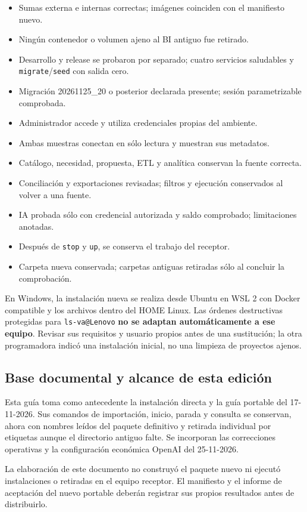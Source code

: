 \documentclass[
  spanish,
  10pt,
  a4paper,
]{article}
\providecommand{\tightlist}{%
  \setlength{\itemsep}{0pt}\setlength{\parskip}{0pt}}
\begin{document}
\begin{itemize}
\tightlist
\item[$\square$]
  Sumas externa e internas correctas; imágenes coinciden con el
  manifiesto nuevo.
\item[$\square$]
  Ningún contenedor o volumen ajeno al BI antiguo fue retirado.
\item[$\square$]
  Desarrollo y release se probaron por separado; cuatro servicios
  saludables y \texttt{migrate}/\texttt{seed} con salida cero.
\item[$\square$]
  Migración 20261125\_20 o posterior declarada presente; sesión
  parametrizable comprobada.
\item[$\square$]
  Administrador accede y utiliza credenciales propias del ambiente.
\item[$\square$]
  Ambas muestras conectan en sólo lectura y muestran sus metadatos.
\item[$\square$]
  Catálogo, necesidad, propuesta, ETL y analítica conservan la fuente
  correcta.
\item[$\square$]
  Conciliación y exportaciones revisadas; filtros y ejecución
  conservados al volver a una fuente.
\item[$\square$]
  IA probada sólo con credencial autorizada y saldo comprobado;
  limitaciones anotadas.
\item[$\square$]
  Después de \texttt{stop} y \texttt{up}, se conserva el trabajo del
  receptor.
\item[$\square$]
  Carpeta nueva conservada; carpetas antiguas retiradas sólo al concluir
  la comprobación.
\end{itemize}

En Windows, la instalación nueva se realiza desde Ubuntu en WSL 2 con
Docker compatible y los archivos dentro del HOME Linux. Las órdenes
destructivas protegidas para \texttt{ls-va@Lenovo} \textbf{no se adaptan
automáticamente a ese equipo}. Revisar sus requisitos y usuario propios
antes de una sustitución; la otra programadora indicó una instalación
inicial, no una limpieza de proyectos ajenos.

\subsection{Base documental y alcance de esta
edición}\label{base-documental-y-alcance-de-esta-ediciuxf3n}

Esta guía toma como antecedente la instalación directa y la guía
portable del 17-11-2026. Sus comandos de importación, inicio, parada y
consulta se conservan, ahora con nombres leídos del paquete definitivo y
retirada individual por etiquetas aunque el directorio antiguo falte. Se
incorporan las correcciones operativas y la configuración económica
OpenAI del 25-11-2026.

La elaboración de este documento no construyó el paquete nuevo ni
ejecutó instalaciones o retiradas en el equipo receptor. El manifiesto y
el informe de aceptación del nuevo portable deberán registrar sus
propios resultados antes de distribuirlo.
\end{document}
